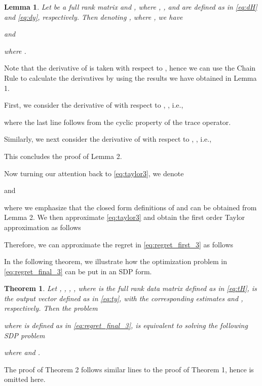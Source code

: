 \documentclass[review,sort&compress]{elsarticle}
\newtheorem{thm}{Theorem}
\newtheorem{lem}{Lemma}
\begin{document}
\begin{lem}\label{lem2}
Let  be a full rank matrix and , where , ,  and  are defined as in \eqref{eq:dH} and \eqref{eq:dy}, respectively. Then denoting , where , we have

and

where .
\end{lem}

\begin{pol2}
Note that the derivative of  is taken with respect to , hence we can use the Chain Rule to calculate the derivatives by using the results we have obtained in Lemma 1.

First, we consider the derivative of  with respect to , , i.e.,

where the last line follows from the cyclic property of the trace operator.


Similarly, we next consider the derivative of  with respect to , , i.e.,

This concludes the proof of Lemma 2. \hfill 
\end{pol2}



Now turning our attention back to \eqref{eq:taylor3}, we denote

and

where we emphasize that the closed form definitions of  and  can be obtained from Lemma 2. We then approximate \eqref{eq:taylor3} and obtain the first order Taylor approximation as follows

Therefore, we can approximate the regret in \eqref{eq:regret_first_3} as follows


In the following theorem, we illustrate how the optimization problem in \eqref{eq:regret_final_3} can
be put in an SDP form.

\begin{thm}\label{thm3}
Let , , , , where  is the full rank data matrix defined as in \eqref{eq:tH},  is the output vector defined as in \eqref{eq:ty}, with the corresponding estimates  and , respectively. Then the problem

where  is defined as in \eqref{eq:regret_final_3}, is equivalent to solving the following SDP problem

where  and .
\end{thm}

\begin{pot3}
The proof of Theorem 2 follows similar lines to the proof of Theorem 1, hence is omitted here. \hfill 
\end{pot3}
\end{document}

